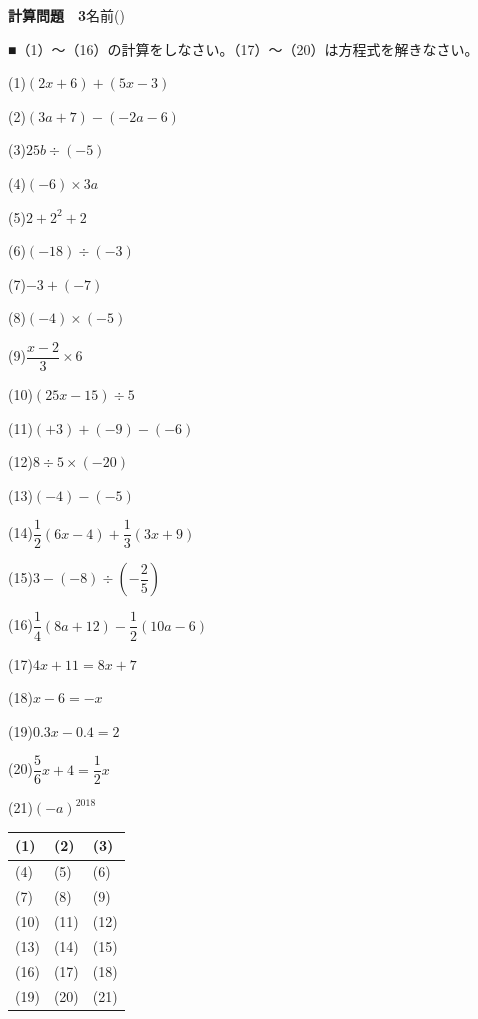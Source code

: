 \documentclass[a4paper,11pt]{ltjsarticle}
\newlength{\qcol}\setlength{\qcol}{0.47\textwidth}
\newlength{\qgap}
\newlength{\anscolw}\setlength{\anscolw}{0.30\textwidth}
\newlength{\ansh}
\newcommand{\Q}[2]{\parbox[t]{\qcol}{\raggedright (#1)\hspace{0.6em}$\displaystyle #2$}}
\newcommand{\QR}[4]{\Q{#1}{#2}\hfill\Q{#3}{#4}\par\vspace{\qgap}}
\newcommand{\anscell}[1]{\rule[-\ansdrop]{0pt}{\ansh}(#1)}
\newlength{\ansdrop}
\begin{document}
{\large\bfseries 計算問題　3}\hfill 名前(\underline{\hspace{32mm}})\par\vspace{3mm}
■（1）〜（16）の計算をしなさい。（17）〜（20）は方程式を解きなさい。\par\vspace{3mm}
\setlength{\qgap}{5.4mm}
\QR{1}{(2x+6)+(5x-3)}{2}{(3a+7)-(-2a-6)}
\QR{3}{25b\div(-5)}{4}{(-6)\times3a}
\QR{5}{2+2^2+2}{6}{(-18)\div(-3)}
\QR{7}{-3+(-7)}{8}{(-4)\times(-5)}
\QR{9}{\dfrac{x-2}{3}\times6}{10}{(25x-15)\div5}
\QR{11}{(+3)+(-9)-(-6)}{12}{8\div5\times(-20)}
\QR{13}{(-4)-(-5)}{14}{\dfrac{1}{2}(6x-4)+\dfrac{1}{3}(3x+9)}
\QR{15}{3-(-8)\div\left(-\dfrac{2}{5}\right)}{16}{\dfrac{1}{4}(8a+12)-\dfrac{1}{2}(10a-6)}
\QR{17}{4x+11=8x+7}{18}{x-6=-x}
\QR{19}{0.3x-0.4=2}{20}{\dfrac{5}{6}x+4=\dfrac{1}{2}x}
\vspace{1mm}
\Q{21}{(-a)^{2018}}\par\vspace{3mm}
\setlength{\ansh}{9.5mm}\setlength{\ansdrop}{6mm}%
\begin{center}\begin{tabular}{|p{\anscolw}|p{\anscolw}|p{\anscolw}|}\hline
\anscell{1} & \anscell{2} & \anscell{3} \\\hline
\anscell{4} & \anscell{5} & \anscell{6} \\\hline
\anscell{7} & \anscell{8} & \anscell{9} \\\hline
\anscell{10} & \anscell{11} & \anscell{12} \\\hline
\anscell{13} & \anscell{14} & \anscell{15} \\\hline
\anscell{16} & \anscell{17} & \anscell{18} \\\hline
\anscell{19} & \anscell{20} & \anscell{21} \\\hline
\end{tabular}\end{center}
\end{document}
